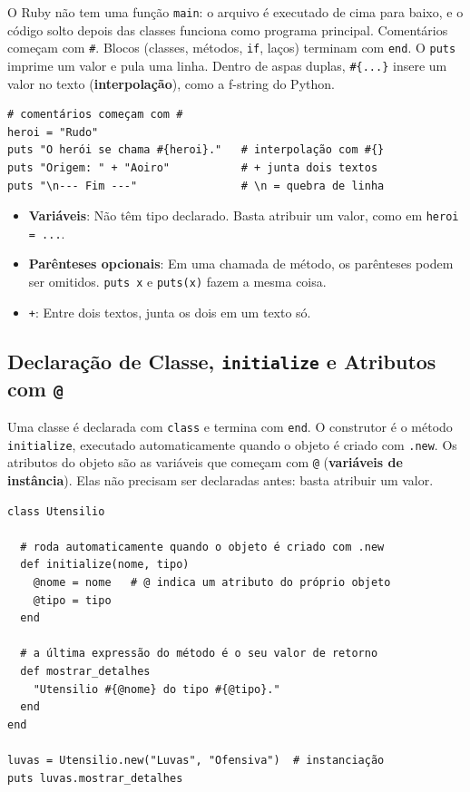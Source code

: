 O Ruby não tem uma função \texttt{main}: o arquivo é executado de cima para baixo, e o código
solto depois das classes funciona como programa principal. Comentários começam com \texttt{\#}.
Blocos (classes, métodos, \texttt{if}, laços) terminam com \texttt{end}. O \texttt{puts} imprime
um valor e pula uma linha. Dentro de aspas duplas, \texttt{\#\{...\}} insere um valor no texto
(\textbf{interpolação}), como a f-string do Python.

\begin{lstlisting}[style=ruby]
# comentários começam com #
heroi = "Rudo"
puts "O herói se chama #{heroi}."   # interpolação com #{}
puts "Origem: " + "Aoiro"           # + junta dois textos
puts "\n--- Fim ---"                # \n = quebra de linha
\end{lstlisting}

\begin{itemize}
    \item \textbf{Variáveis}: Não têm tipo declarado. Basta atribuir um valor, como em
    \texttt{heroi = ...}.

    \item \textbf{Parênteses opcionais}: Em uma chamada de método, os parênteses podem ser
    omitidos. \texttt{puts x} e \texttt{puts(x)} fazem a mesma coisa.

    \item \texttt{+}: Entre dois textos, junta os dois em um texto só.
\end{itemize}

\subsection{Declaração de Classe, \texttt{initialize} e Atributos com \texttt{@}}

Uma classe é declarada com \texttt{class} e termina com \texttt{end}. O construtor é o método
\texttt{initialize}, executado automaticamente quando o objeto é criado com \texttt{.new}. Os
atributos do objeto são as variáveis que começam com \texttt{@} (\textbf{variáveis de
instância}). Elas não precisam ser declaradas antes: basta atribuir um valor.

\begin{lstlisting}[style=ruby]
class Utensilio

  # roda automaticamente quando o objeto é criado com .new
  def initialize(nome, tipo)
    @nome = nome   # @ indica um atributo do próprio objeto
    @tipo = tipo
  end

  # a última expressão do método é o seu valor de retorno
  def mostrar_detalhes
    "Utensilio #{@nome} do tipo #{@tipo}."
  end
end

luvas = Utensilio.new("Luvas", "Ofensiva")  # instanciação
puts luvas.mostrar_detalhes
\end{lstlisting}

